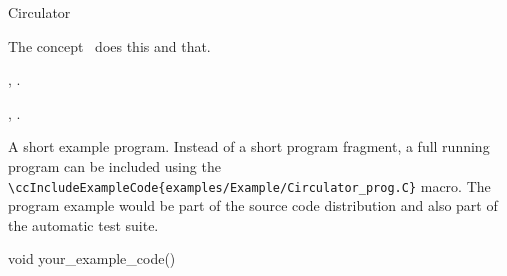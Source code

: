 
\gdef\ccRefPageBegin{\ccParDims\cgalColumnLayout\begin{ccAdvanced}}
\gdef\ccRefPageEnd{\ccParDims\cgalColumnLayout\end{ccAdvanced}}
\begin{ccRefConcept}{Circulator}


\ccDefinition
  
The concept \ccRefName\ does this and that.

\ccTypes


\ccCreation
{}  %


\ccOperations


\clearpage
\ccHasModels

,
.

\ccSeeAlso

,
.

\ccExample

A short example program.
Instead of a short program fragment, a full running program can be
included using the 
\verb|\ccIncludeExampleCode{examples/Example/Circulator_prog.C}| 
macro. The program example would be part of the source code distribution and
also part of the automatic test suite.

\begin{ccExampleCode}
void your_example_code() {
}
\end{ccExampleCode}


\end{ccRefConcept}
\gdef\ccRefPageBegin{\ccParDims\cgalColumnLayout}
\gdef\ccRefPageEnd{\ccParDims\cgalColumnLayout}


